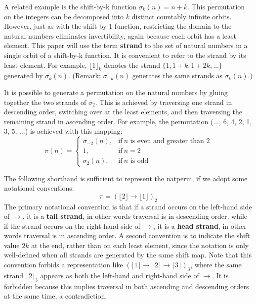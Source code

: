 \documentclass[12pt,reqno]{article}
\begin{document}
A related example is the shift-by-k function $\sigma_k(n) = n + k$. This permutation on the integers can be decomposed into $k$ distinct countably infinite orbits. However, just as with the shift-by-1 function, restricting the domain to the natural numbers eliminates invertibility, again because each orbit has a least element. This paper will use the term \textbf{strand} to the set of natural numbers in a single orbit of a shift-by-k function. It is convenient to refer to the strand by its least element. For example, ${\lfloor 1 \rfloor}_k$ denotes the strand $\{ 1, 1 + k, 1 + 2k, \ldots \}$ generated by $\sigma_k(n)$. (Remark: $\sigma_{-k}(n)$ generates the same strands as $\sigma_k(n)$.)

It is possible to generate a permutation on the natural numbers by gluing together the two strands of $\sigma_2$. This is achieved by traversing one strand in descending order, switching over at the least elements, and then traversing the remaining strand in ascending order. For example, the permutation ($\ldots$, 6, 4, 2, 1, 3, 5, $\ldots$) is achieved with this mapping:
\begin{equation}
    \pi(n) = \begin{cases}
        \sigma_{-2}(n), & \text{if}\ n \text{ is even and greater than 2} \\
        1, & \text{if}\ n = 2 \\
        \sigma_2(n), & \text{if}\ n \text{ is odd} 
    \end{cases}
\end{equation}

The following shorthand is sufficient to represent the natperm, if we adopt some notational conventions:
\begin{equation}
  \pi = {(\lfloor 2 \rfloor \rightarrow \lfloor 1 \rfloor)}_2
\end{equation}
The primary notational convention is that if a strand occurs on the left-hand side of $\rightarrow$, it is a \textbf{tail strand}, in other words traversal is in descending order, while if the strand occurs on the right-hand side of $\rightarrow$, it is a \textbf{head strand}, in other words traversal is in ascending order. A second convention is to indicate the shift value $2k$ at the end, rather than on each least element, since the notation is only well-defined when all strands are generated by the same shift map. Note that this convention forbids a representation like ${(\lfloor 1 \rfloor \rightarrow \lfloor 2 \rfloor \rightarrow \lfloor 3 \rfloor)}_3$, where the same strand ${\lfloor 2 \rfloor}_3$ appears as both the left-hand and right-hand side of $\rightarrow$. It is forbidden because this implies traversal in both ascending and descending orders at the same time, a contradiction.
\end{document}
